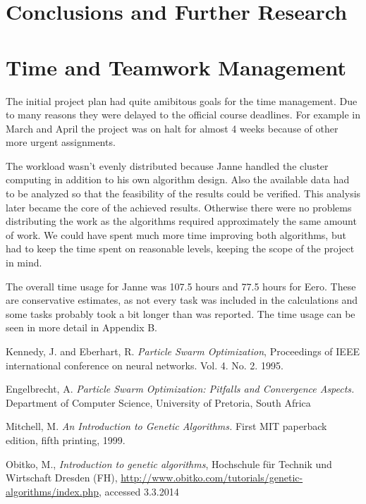 \documentclass[twoside]{article}
\begin{document}
\begin{multicols}{2}
\section{Conclusions and Further Research}



\section{Time and Teamwork Management}
The initial project plan had quite amibitous goals for the time management. Due to many reasons they were delayed to the official course deadlines. For example in March and April the project was on halt for almost 4 weeks because of other more urgent assignments.

The workload wasn't evenly distributed because Janne handled the cluster computing in addition to his own algorithm design. Also the available data had to be analyzed so that the feasibility of the results could be verified. This analysis later became the core of the achieved results. Otherwise there were no problems distributing the work as the algorithms required approximately the same amount of work. We could have spent much more time improving both algorithms, but had to keep the time spent on reasonable levels, keeping the scope of the project in mind.

The overall time usage for Janne was 107.5 hours and 77.5 hours for Eero. These are conservative estimates, as not every task was included in the calculations and some tasks probably took a bit longer than was reported. The time usage can be seen in more detail in Appendix B.



\begin{thebibliography}{99} %
 Kennedy, J. and Eberhart, R.
  \emph{Particle Swarm Optimization},
 Proceedings of IEEE international conference on neural networks. Vol. 4. No. 2. 1995. 

 Engelbrecht, A. \emph{Particle Swarm Optimization: Pitfalls and Convergence Aspects.}
 Department of Computer Science, University of Pretoria, South Africa
 
Mitchell, M. \emph{An Introduction to Genetic Algorithms.} First MIT paperback edition, fifth printing, 1999. 
 
Obitko, M., \emph{Introduction to genetic algorithms}, Hochschule f\"ur Technik und Wirtschaft Dresden (FH), \url{http://www.obitko.com/tutorials/genetic-algorithms/index.php}, accessed 3.3.2014

\end{thebibliography}


\end{multicols}
\newpage
\appendix
\end{document}
